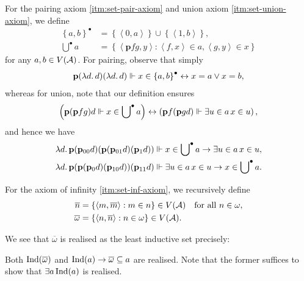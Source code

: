 \documentclass[12pt,openany]{book}
\theoremstyle{plain}
\theoremstyle{definition}
\newcommand\tuple[1]{\left\langle #1 \right\rangle}
\newcommand\opE[1]{\mathop{\exists #1}}
\newcommand\oplam[1]{\mathop{\lambda #1.}}
\DeclareMathOperator\Ind{Ind}
\newcommand\bp{\mathbf{p}}
\begin{document}
For the pairing axiom \ref{itm:set-pair-axiom} and union axiom \ref{itm:set-union-axiom}, we define
\begin{align*}
  \left\{a, b\right\}^\bullet & = \left\{\tuple{0, a}\right\} \cup \left\{\tuple{1, b}\right\},            \\
  \bigcup\nolimits^\bullet a  & = \left\{\tuple{\bp fg, y}: \tuple{f, x} \in a, \tuple{g, y} \in x\right\}
\end{align*}
for any $a, b \in V\mleft(\mathcal{A}\mright)$. For pairing, observe that simply
\[\bp \mleft(\oplam{d} d\mright) \mleft(\oplam{d} d\mright) \Vdash x \in \left\{a, b\right\}^\bullet \leftrightarrow x = a \lor x = b,\]
whereas for union, note that our definition ensures
\[\left(\bp \mleft(\bp fg\mright) d \Vdash x \in \bigcup\nolimits^\bullet a\right) \leftrightarrow \left(\bp f \mleft(\bp gd\mright) \Vdash \opE{u \in a} x \in u\right),\]
and hence we have
\begin{align*}
  \oplam{d} \bp \mleft(\bp_{00} d\mright) \mleft(\bp \mleft(\bp_{01} d\mright) \mleft(\bp_1 d\mright)\mright) & \Vdash x \in \bigcup\nolimits^\bullet a \rightarrow \opE{u \in a} x \in u, \\
  \oplam{d} \bp \mleft(\bp \mleft(\bp_0 d\mright) \mleft(\bp_{10} d\mright)\mright) \mleft(\bp_{11} d\mright) & \Vdash \opE{u \in a} x \in u \rightarrow x \in \bigcup\nolimits^\bullet a.
\end{align*}

For the axiom of infinity \ref{itm:set-inf-axiom}, we recursively define
\begin{align*}
  \overline{n}      & = \left\{\tuple{m, \overline{m}} : m \in n\right\} \in V\mleft(\mathcal{A}\mright) \quad \text{for all $n \in \omega$}, \\
  \overline{\omega} & = \left\{\tuple{n, \overline{n}} : n \in \omega\right\} \in V\mleft(\mathcal{A}\mright).
\end{align*}

We see that $\overline{\omega}$ is realised as the least inductive set precisely:
\begin{lemma}
  \label{lem:czf-real-omega-least-ind}
  Both $\Ind\mleft(\overline{\omega}\mright)$ and $\Ind\mleft(a\mright) \rightarrow \overline{\omega} \subseteq a$ are realised. Note that the former suffices to show that $\opE{a} \Ind\mleft(a\mright)$ is realised.
\end{lemma}
\end{document}
